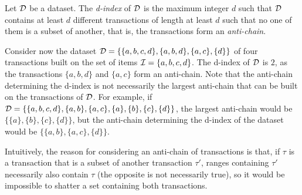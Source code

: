 \begin{definition}\label{defn:dindex}
  Let ${\cal D}$ be a dataset. The \emph{d-index} of ${\cal D}$ is the maximum integer $d$
  such that ${\cal D}$ contains at least $d$ different transactions of length at
  least $d$ such that no one of them is a subset of another,
  that is, the transactions form an \emph{anti-chain}.
\end{definition}

Consider now the dataset ${\cal D}=\{\{a,b,c,d\},\{a,b,d\},\{a,c\},\{d\}\}$ of four
transactions built on the set of items ${\cal I}=\{a,b,c,d\}$. The d-index of ${\cal D}$ is
$2$, as the transactions $\{a,b,d\}$ and $\{a,c\}$ form an anti-chain.
Note that the anti-chain determining the d-index 
is not necessarily the largest anti-chain that can be built on the transactions of
${\cal D}$. For example, if
${\cal D}=\{\{a,b,c,d\},\{a,b\},\{a,c\},\{a\},\{b\},\{c\},\{d\}\}$, the largest
anti-chain would be $\{\{a\},\{b\},\{c\},\{d\}\}$, but the anti-chain
determining the d-index of the dataset 
would be $\{\{a,b\},\{a,c\},\{d\}\}$.

Intuitively, the reason for considering an anti-chain of transactions is  
that, if $\tau$ is a transaction  that is a subset of another transaction
$\tau'$, ranges containing $\tau'$ necessarily also contain $\tau$ (the opposite
is not necessarily true), so it would be impossible to shatter a set containing
both transactions. 


